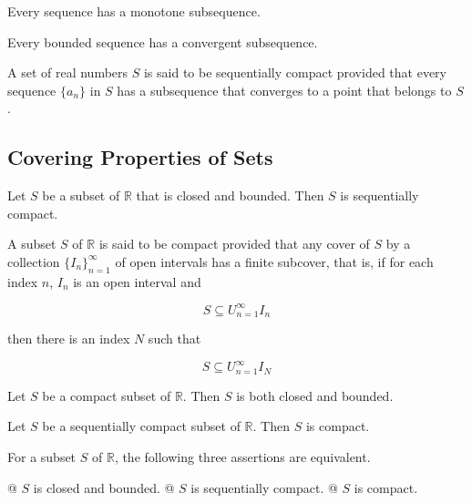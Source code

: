     \begin{thm}
        Every sequence has a monotone subsequence.
    \end{thm}

    \begin{thm}
        Every bounded sequence has a convergent subsequence.
    \end{thm}

    \begin{definition}
        A set of real numbers $S$ is said to be sequentially compact provided that every sequence $\{a_n\}$ in $S$ has a
        subsequence that converges to a point that belongs to $S$.
    \end{definition}

    \subsection{Covering Properties of Sets}
    Let $S$ be a subset of $\mathbb{R}$ that is closed and bounded. Then $S$ is sequentially compact.

    \begin{definition}[Compact]
        A subset $S$ of $\mathbb{R}$ is said to be compact provided that any cover of $S$ by a collection
        $\{I_n\}_{n=1}^\infty$ of open intervals has a finite subcover, that is, if for each index $n$, $I_n$ is an open
        interval and

        \[
            S \subseteq U_{n=1}^\infty I_n
        \]

        then there is an index $N$ such that

        \[
            S \subseteq U_{n=1}^\infty I_N
        \]
    \end{definition}

    Let $S$ be a compact subset of $\mathbb{R}$. Then $S$ is both closed and bounded.

    Let $S$ be a sequentially compact subset of $\mathbb{R}$. Then $S$ is compact.

    \begin{thm}
        For a subset $S$ of $\mathbb{R}$, the following three assertions are equivalent.

        \begin{easylist}[itemize]
            @ $S$ is closed and bounded.
            @ $S$ is sequentially compact.
            @ $S$ is compact.
        \end{easylist}
    \end{thm}

